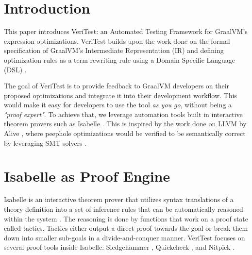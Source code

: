 \documentclass[conference,a4paper,english,10pt]{IEEEtran}[2015/08/26]
\begin{document}
\section{Introduction}
\label{sec:introduction}



This paper introduces VeriTest: an Automated Testing Framework for GraalVM's expression optimizations. VeriTest builds upon the work done on 
the formal specification of GraalVM's Intermediate Representation (IR) \cite{ATVA21_GraalVM_IR_Semantics} and defining optimization rules as a term 
rewriting rule using a Domain Specific Language (DSL) \cite{Term_Graph_Optimizations}. 

The goal of VeriTest is to provide feedback to GraalVM \cite{graal} developers on their proposed optimizations and integrate it into their 
development workflow. This would make it easy for developers to use the tool \emph{as you go}, without being a \emph{"proof expert"}.
To achieve that, we leverage automation tools built in interactive theorem provers such as Isabelle \cite{isabelleProof}.
This is inspired by the work done on LLVM by Alive \cite{AliveInLean}, where peephole optimizations would be verified to be semantically 
correct by leveraging SMT solvers \cite[Sec. 3.1.1]{AliveInLean}.

\section{Isabelle as Proof Engine}
\label{sec:Isabelle}

Isabelle is an interactive theorem prover that utilizes syntax translations of a theory definition into a set of inference rules that can be 
automatically reasoned within the system \cite{isabelleProof}. The reasoning is done by functions that work on a proof state called tactics. 
Tactics either output a direct proof towards the goal or break them down into smaller sub-goals in a divide-and-conquer manner. VeriTest focuses 
on several proof tools inside Isabelle: Sledgehammer \cite[Sec. 3]{isabelleProof}, Quickcheck \cite[Sec. 4]{isabelleProof}, 
and Nitpick \cite[Sec. 5]{isabelleProof}.
\end{document}
